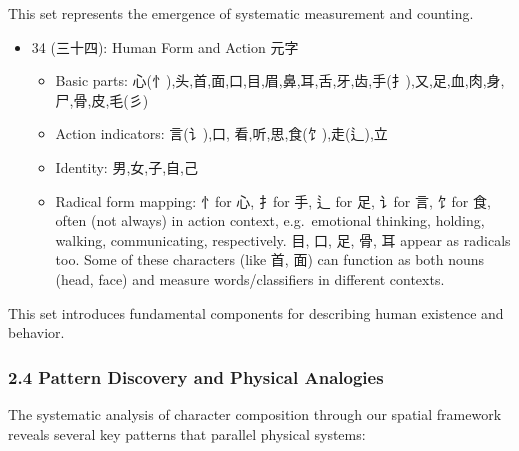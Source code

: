 \documentclass[
  11pt,
  letterpaper,
]{article}
\providecommand{\tightlist}{%
  \setlength{\itemsep}{0pt}\setlength{\parskip}{0pt}}
\begin{document}
This set represents the emergence of systematic measurement and
counting.

\begin{itemize}
\tightlist
\item
  34 (三十四): Human Form and Action 元字

  \begin{itemize}
  \tightlist
  \item
    Basic parts:
    心(忄),头,首,面,口,目,眉,鼻,耳,舌,牙,齿,手(扌),又,足,血,肉,身,尸,骨,皮,毛(彡)
  \item
    Action indicators: 言(讠),口, 看,听,思,食(饣),走(辶),立
  \item
    Identity: 男,女,子,自,己
  \item
    Radical form mapping: 忄for 心, 扌for 手, 辶 for 足, 讠for 言, 饣for
    食, often (not always) in action context, e.g.~emotional thinking,
    holding, walking, communicating, respectively. 目, 口, 足, 骨, 耳
    appear as radicals too. Some of these characters (like 首, 面) can
    function as both nouns (head, face) and measure words/classifiers in
    different contexts.
  \end{itemize}
\end{itemize}

This set introduces fundamental components for describing human
existence and behavior.

\hypertarget{pattern-discovery-and-physical-analogies}{%
\subsubsection{2.4 Pattern Discovery and Physical
Analogies}\label{pattern-discovery-and-physical-analogies}}

The systematic analysis of character composition through our spatial
framework reveals several key patterns that parallel physical systems:
\end{document}
